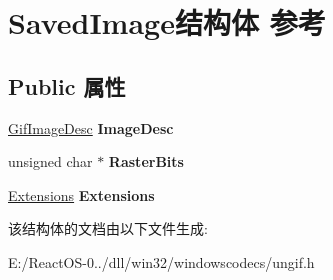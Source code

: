 \hypertarget{struct_saved_image}{}\section{Saved\+Image结构体 参考}
\label{struct_saved_image}
\subsection*{Public 属性}
\begin{DoxyCompactItemize}
\item 
\mbox{\label{struct_saved_image_a486ec53f62ad60f32cbff90d4bbf6ade}} 
\hyperlink{struct_gif_image_desc}{Gif\+Image\+Desc} {\bfseries Image\+Desc}
\item 
\mbox{\label{struct_saved_image_a33b16ec015845579ed0cec9b31d29487}} 
unsigned char $\ast$ {\bfseries Raster\+Bits}
\item 
\mbox{\label{struct_saved_image_a57b90ba6cc3b60b94f2b2c62f16c2fe5}} 
\hyperlink{struct_extensions}{Extensions} {\bfseries Extensions}
\end{DoxyCompactItemize}


该结构体的文档由以下文件生成\+:\begin{DoxyCompactItemize}
\item 
E\+:/\+React\+O\+S-\/0../dll/win32/windowscodecs/ungif.\+h\end{DoxyCompactItemize}
